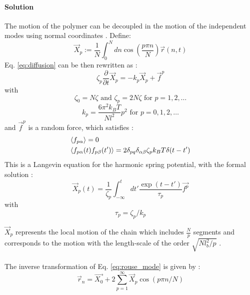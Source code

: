 \documentclass[
    paper=A4,pagesize=automedia,fontsize=12pt,
    BCOR=15mm,DIV=22,
    twoside,headinclude,footinclude=false,
    fleqn,             %
    bibliography=totocnumbered,          %
    listof=totoc,                %
    listof=flat,                 %
    cleardoublepage=empty      %
    numbers=endperiod
]{scrartcl}
\begin{document}
\paragraph{Solution}
The motion of the polymer can be decoupled in the motion of the independent modes using normal
coordinates \cite{Doi_Edwards_PD:1994}. Define:
\begin{equation}
    \label{eq:rouse_mode}
    \vec{X}_p := \frac{1}{N} \int_0^N dn \cos(\frac{p \pi n}{N})\vec{r}(n, t)
\end{equation}
Eq. \ref{eq:diffusion} can be then rewritten as \cite{Doi_Edwards_PD:1994}:
\begin{equation}
    \zeta_p \frac{\partial}{\partial t} \vec{X}_p = -k_p \vec{X}_p + \vec{f}^p
\end{equation}
with 
\begin{equation}
    \zeta_0 = N \zeta
    \text{ and }
    \zeta_p = 2 N \zeta
    \text{ for } p = 1,2,\ldots
\end{equation}
\begin{equation}
    k_p = \frac{6 \pi^2 k_B T}{Nl^2} p^2
    \text{ for } p = 0,1,2,\ldots
\end{equation}
and $\vec{f}^p$ is a random force, which satisfies \cite{Doi_Edwards_PD:1994}:
\begin{equation}
    \begin{aligned}
        & \langle f_{p\alpha}\rangle = 0\\
        & \langle f_{p\alpha}(t) f_{p\beta}(t')\rangle = 2 \delta_{pq} \delta_{\alpha\beta} \zeta_p k_B T \delta(t-t')
    \end{aligned}
\end{equation}
This is a Langevin equation for the harmonic spring potential, 
with the formal solution \cite{Doi_Edwards_PD:1994}:
\begin{equation}
    \vec{X}_p(t) = \frac{1}{\zeta_p} \int_{-\infty}^{t} dt' \frac{\exp(t-t')}{\tau_p} \vec{f^p}
\end{equation}
with
\begin{equation}
    \tau_p = \zeta_p / k_p
\end{equation}

$\vec{X}_p$ represents the local motion of the chain which includes $\frac{N}{p}$ segments and corresponds to the
motion with the length-scale of the order $\sqrt{Nl_b^2/p}$ \cite{Doi_Edwards_PD:1994}.
\\
\\
The inverse transformation of Eq. \ref{eq:rouse_mode} is given by \cite{Doi_Edwards_PD:1994}:
\begin{equation}
    \vec{r}_n = \vec{X_0} + 2 \sum_{p=1}^{\infty} \vec{X}_p \cos(p \pi n  / N)
\end{equation}
\end{document}

